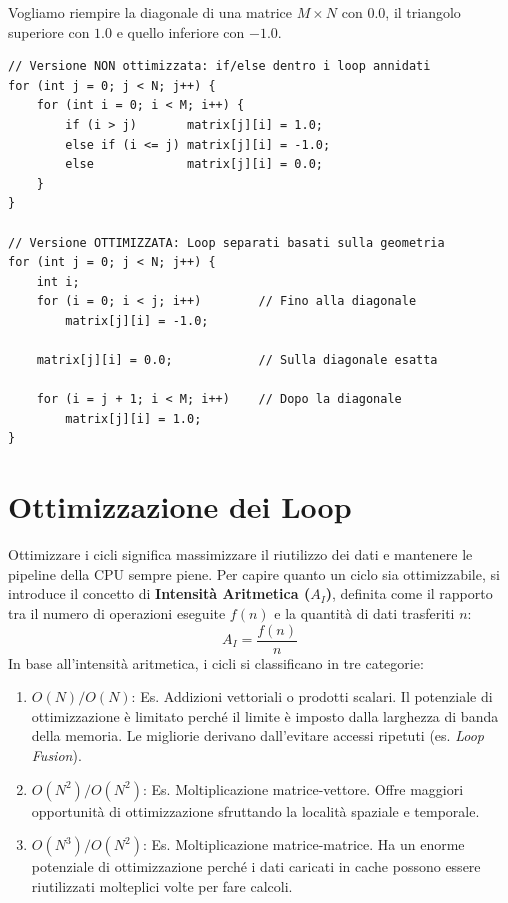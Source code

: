 Vogliamo riempire la diagonale di una matrice $M \times N$ con $0.0$, il triangolo superiore con $1.0$ e quello inferiore con $-1.0$.
\begin{framed}
\footnotesize

\begin{verbatim}
// Versione NON ottimizzata: if/else dentro i loop annidati
for (int j = 0; j < N; j++) {
    for (int i = 0; i < M; i++) {
        if (i > j)       matrix[j][i] = 1.0;
        else if (i <= j) matrix[j][i] = -1.0;
        else             matrix[j][i] = 0.0;
    }
}

// Versione OTTIMIZZATA: Loop separati basati sulla geometria
for (int j = 0; j < N; j++) {
    int i;
    for (i = 0; i < j; i++)        // Fino alla diagonale
        matrix[j][i] = -1.0;
        
    matrix[j][i] = 0.0;            // Sulla diagonale esatta
    
    for (i = j + 1; i < M; i++)    // Dopo la diagonale
        matrix[j][i] = 1.0;
}
\end{verbatim}
\end{framed}
\section{Ottimizzazione dei Loop}
Ottimizzare i cicli significa massimizzare il riutilizzo dei dati e mantenere le pipeline della CPU sempre piene. 
Per capire quanto un ciclo sia ottimizzabile, si introduce il concetto di \textbf{Intensità Aritmetica ($A_I$)}, definita come il rapporto tra il numero di operazioni eseguite $f(n)$ e la quantità di dati trasferiti $n$:
\begin{equation}
    A_I = \frac{f(n)}{n}
\end{equation}
In base all'intensità aritmetica, i cicli si classificano in tre categorie:
\begin{enumerate}
    \item \textbf{$O(N)/O(N)$}: Es. Addizioni vettoriali o prodotti scalari. Il potenziale di ottimizzazione è limitato perché il limite è imposto dalla larghezza di banda della memoria. Le migliorie derivano dall'evitare accessi ripetuti (es. \textit{Loop Fusion}).
    \item \textbf{$O(N^2)/O(N^2)$}: Es. Moltiplicazione matrice-vettore. Offre maggiori opportunità di ottimizzazione sfruttando la località spaziale e temporale.
    \item \textbf{$O(N^3)/O(N^2)$}: Es. Moltiplicazione matrice-matrice. Ha un enorme potenziale di ottimizzazione perché i dati caricati in cache possono essere riutilizzati molteplici volte per fare calcoli.
\end{enumerate}
